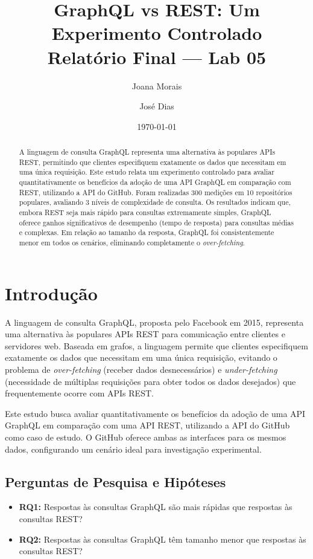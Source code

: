 \documentclass[12pt,a4paper]{article}
\title{GraphQL vs REST: Um Experimento Controlado\\ \large Relatório Final --- Lab 05}
\author{Joana Morais \and José Dias}
\date{\today}
\begin{document}
\maketitle

\begin{abstract}
A linguagem de consulta GraphQL representa uma alternativa às populares APIs REST, permitindo que clientes especifiquem exatamente os dados que necessitam em uma única requisição. Este estudo relata um experimento controlado para avaliar quantitativamente os benefícios da adoção de uma API GraphQL em comparação com REST, utilizando a API do GitHub. Foram realizadas 300 medições em 10 repositórios populares, avaliando 3 níveis de complexidade de consulta. Os resultados indicam que, embora REST seja mais rápido para consultas extremamente simples, GraphQL oferece ganhos significativos de desempenho (tempo de resposta) para consultas médias e complexas. Em relação ao tamanho da resposta, GraphQL foi consistentemente menor em todos os cenários, eliminando completamente o \textit{over-fetching}.
\end{abstract}

\section{Introdução}

A linguagem de consulta GraphQL, proposta pelo Facebook em 2015, representa uma alternativa às populares APIs REST para comunicação entre clientes e servidores web. Baseada em grafos, a linguagem permite que clientes especifiquem exatamente os dados que necessitam em uma única requisição, evitando o problema de \textit{over-fetching} (receber dados desnecessários) e \textit{under-fetching} (necessidade de múltiplas requisições para obter todos os dados desejados) que frequentemente ocorre com APIs REST.

Este estudo busca avaliar quantitativamente os benefícios da adoção de uma API GraphQL em comparação com uma API REST, utilizando a API do GitHub como caso de estudo. O GitHub oferece ambas as interfaces para os mesmos dados, configurando um cenário ideal para investigação experimental.

\subsection{Perguntas de Pesquisa e Hipóteses}

\begin{itemize}
    \item \textbf{RQ1:} Respostas às consultas GraphQL são mais rápidas que respostas às consultas REST?
    \item \textbf{RQ2:} Respostas às consultas GraphQL têm tamanho menor que respostas às consultas REST?
\end{itemize}
\end{document}
